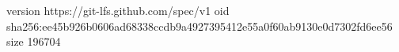 version https://git-lfs.github.com/spec/v1
oid sha256:ee45b926b0606ad68338ccdb9a4927395412e55a0f60ab9130e0d7302fd6ee56
size 196704
